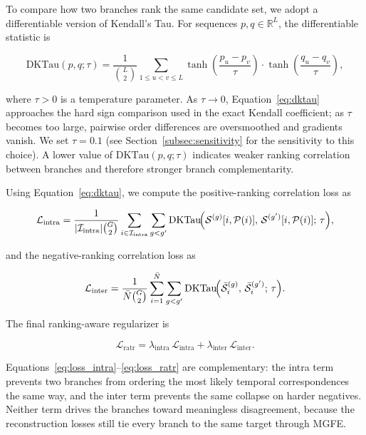 To compare how two branches rank the same candidate set, we adopt a differentiable version of Kendall's Tau. For sequences $p,q\in\mathbb{R}^{L}$, the differentiable statistic is

\begin{equation}
\mathrm{DKTau}(p,q;\tau)
= \frac{1}{\binom{L}{2}}
\sum_{1\le u < v \le L}
\tanh\!\!\left(\frac{p_u-p_v}{\tau}\right)
\cdot
\tanh\!\!\left(\frac{q_u-q_v}{\tau}\right),
\label{eq:dktau}
\end{equation}

where $\tau>0$ is a temperature parameter. As $\tau\rightarrow 0$, Equation~\eqref{eq:dktau} approaches the hard sign comparison used in the exact Kendall coefficient; as $\tau$ becomes too large, pairwise order differences are oversmoothed and gradients vanish. We set $\tau=0.1$ (see Section~\ref{subsec:sensitivity} for the sensitivity to this choice). A lower value of $\mathrm{DKTau}(p,q;\tau)$ indicates weaker ranking correlation between branches and therefore stronger branch complementarity.

Using Equation~\eqref{eq:dktau}, we compute the positive-ranking correlation loss as

\begin{equation}
\mathcal{L}_{\text{intra}} =
\frac{1}{|\mathcal{I}_{\text{intra}}| \binom{G}{2}}
\sum_{i\in\mathcal{I}_{\text{intra}}}
\sum_{g < g'}
\mathrm{DKTau}\!\Bigl(
\mathcal{S}^{(g)}[i,\mathcal{P}(i)],\,
\mathcal{S}^{(g')}[i,\mathcal{P}(i)];\,\tau
\Bigr),
\label{eq:loss_intra}
\end{equation}

and the negative-ranking correlation loss as

\begin{equation}
\mathcal{L}_{\text{inter}} =
\frac{1}{\bar{N} \binom{G}{2}}
\sum_{i=1}^{\bar{N}}
\sum_{g < g'}
\mathrm{DKTau}\!\Bigl(
\bar{\mathcal{S}}_i^{(g)},\,
\bar{\mathcal{S}}_i^{(g')};\,
\tau
\Bigr).
\end{equation}

The final ranking-aware regularizer is

\begin{equation}
\mathcal{L}_{\text{ratr}} =
\lambda_{\text{intra}}\,\mathcal{L}_{\text{intra}}
+ \lambda_{\text{inter}}\,\mathcal{L}_{\text{inter}}.
\label{eq:loss_ratr}
\end{equation}

Equations~\eqref{eq:loss_intra}--\eqref{eq:loss_ratr} are complementary: the intra term prevents two branches from ordering the most likely temporal correspondences the same way, and the inter term prevents the same collapse on harder negatives. Neither term drives the branches toward meaningless disagreement, because the reconstruction losses still tie every branch to the same target through MGFE.

